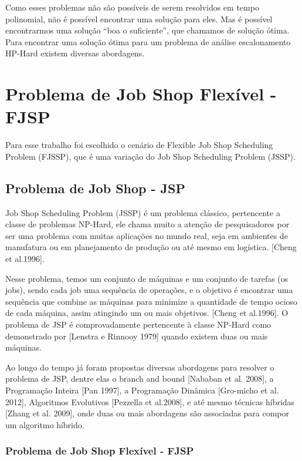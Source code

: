 Como esses problemas não são possíveis de serem resolvidos em tempo polinomial, não é possível encontrar uma solução para eles. Mas é possível encontrarmos uma solução “boa o suficiente”, que chamamos de solução ótima. Para encontrar uma solução ótima para um problema de análise escalonamento HP-Hard existem diversas abordagens.\newline



\section{Problema de Job Shop Flexível - FJSP}
Para esse trabalho foi escolhido o cenário de Flexible Job Shop  Scheduling Problem (FJSSP), que é uma variação do Job Shop  Scheduling Problem (JSSP).

\subsection{Problema de Job Shop - JSP} 
Job Shop Scheduling Problem (JSSP) é um problema clássico, pertencente a classe de problemas NP-Hard, ele chama muito a atenção de pesquisadores por ser uma problema com muitas aplicações no mundo real, seja em ambientes de manufatura ou em planejamento de produção ou até mesmo em logística. [Cheng et al.1996].\newline

Nesse problema, temos um conjunto de máquinas e um conjunto de tarefas (os jobs), sendo cada job uma sequência de operações, e o objetivo é encontrar uma sequência que combine as máquinas para minimize a quantidade de tempo ocioso de cada máquina, assim atingindo um ou mais objetivos. [Cheng et al.1996]. O problema de JSP é comprovadamente pertencente à classe NP-Hard como demonstrado por [Lenstra e Rinnooy 1979] quando existem duas ou mais máquinas. \newline

Ao longo do tempo já foram propostas diversas abordagens para resolver o problema de JSP, dentre elas o branch and bound [Nababan et al. 2008], a Programação Inteira [Pan 1997], a Programação Dinâmica [Gro-micho et al. 2012], Algoritmos Evolutivos [Pezzella et al.2008], e até mesmo técnicas híbridas [Zhang et al. 2009], onde duas ou mais abordagens são associadas para compor um algoritmo híbrido.\newline

\subsubsection{Problema de Job Shop Flexível - FJSP}
\lipsum[3]

